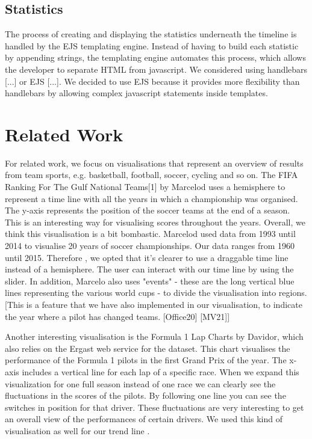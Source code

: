 \documentclass{sigchi}
\begin{document}
\subsection{Statistics} %
\label{sub:statistics}

The process of creating and displaying the statistics underneath the timeline is handled by the EJS templating engine. Instead of having to build each statistic by appending strings, the templating engine automates this process, which allows the developer to separate HTML from javascript. 
We considered using handlebars [...] or EJS [...]. We decided to use EJS because it provides more flexibility than handlebars by allowing complex javascript statements inside templates. 

\section{Related Work} %
\label{sec:related_work}

For related work, we focus on visualisations that represent an overview of results from team sports, e.g. basketball, football, soccer, cycling and so on.  
The FIFA Ranking For The Gulf National Teams[1] by Marcelod uses a hemisphere to represent a time line with all the years in which a championship was organised. The y-axis represents the position of the soccer teams at the end of a season. This is an interesting way for visualising scores throughout the years. Overall, we think this visualisation is a bit bombastic. Marcelod used data from 1993 until 2014 to visualise 20 years of soccer championships. Our data ranges from 1960 until 2015. Therefore , we opted that it’s clearer to use a draggable time line instead of a hemisphere. The user can interact with our time line by using the slider. In addition, Marcelo also uses "events" - these are the long vertical blue lines representing the various world cups - to divide the visualisation into regions. [This is a feature that we have also implemented in our visualisation, to indicate the year where a pilot has changed teams. [Office20] [MV21]] 
 

Another interesting visualisation is the Formula 1 Lap Charts by Davidor, which also relies on the Ergast web service for the dataset. This chart visualises the performance of the Formula 1 pilots in the first Grand Prix of the year. The x-axis includes a vertical line for each lap of a specific race. When we expand this visualization for one full season instead of one race we can clearly see the fluctuations in the scores of the pilots. By following one line you can see the switches in position for that driver. These fluctuations are very interesting to get an overall view of the performances of certain drivers. We used this kind of visualisation as well for our trend line .
\end{document}

